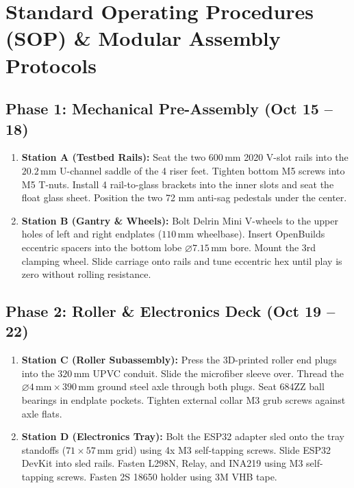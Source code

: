 \documentclass[10pt,a4paper]{article}
\begin{document}
\section{Standard Operating Procedures (SOP) \& Modular Assembly Protocols}

\subsection{Phase 1: Mechanical Pre-Assembly (Oct 15 -- 18)}
\begin{enumerate}[leftmargin=*]
    \item \textbf{Station A (Testbed Rails):} Seat the two $600\,\text{mm}$ 2020 V-slot rails into the $20.2\,\text{mm}$ U-channel saddle of the 4 riser feet. Tighten bottom M5 screws into M5 T-nuts. Install 4 rail-to-glass brackets into the inner slots and seat the float glass sheet. Position the two 72 mm anti-sag pedestals under the center.
    \item \textbf{Station B (Gantry \& Wheels):} Bolt Delrin Mini V-wheels to the upper holes of left and right endplates ($110\,\text{mm}$ wheelbase). Insert OpenBuilds eccentric spacers into the bottom lobe $\varnothing 7.15\,\text{mm}$ bore. Mount the 3rd clamping wheel. Slide carriage onto rails and tune eccentric hex until play is zero without rolling resistance.
\end{enumerate}

\subsection{Phase 2: Roller \& Electronics Deck (Oct 19 -- 22)}
\begin{enumerate}[leftmargin=*]
    \item \textbf{Station C (Roller Subassembly):} Press the 3D-printed roller end plugs into the $320\,\text{mm}$ UPVC conduit. Slide the microfiber sleeve over. Thread the $\varnothing 4\,\text{mm} \times 390\,\text{mm}$ ground steel axle through both plugs. Seat 684ZZ ball bearings in endplate pockets. Tighten external collar M3 grub screws against axle flats.
    \item \textbf{Station D (Electronics Tray):} Bolt the ESP32 adapter sled onto the tray standoffs ($71 \times 57\,\text{mm}$ grid) using 4x M3 self-tapping screws. Slide ESP32 DevKit into sled rails. Fasten L298N, Relay, and INA219 using M3 self-tapping screws. Fasten 2S 18650 holder using 3M VHB tape.
\end{enumerate}
\end{document}
